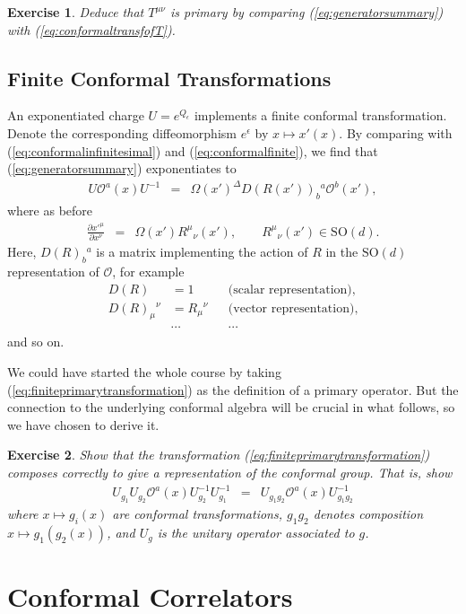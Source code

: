 \documentclass[11pt]{ws-rv9x6}
\newcommand\be{\begin{eqnarray}}
\newcommand\ee{\end{eqnarray}}
\newcommand\cO{\mathcal{O}}
\newcommand\e\epsilon
\newcommand\<\langle
\renewcommand\>\rangle
\newcommand\nn{\nonumber}
\renewcommand\.{\cdot}
\newcommand\pdr[2]{\frac{\partial #1}{\partial #2}}
\newcommand\SO{\mathrm{SO}}
\newcommand\De{\Delta}
\newtheorem{exercise}{Exercise}[section]
\begin{document}
\begin{exercise}
Deduce that $T^{\mu\nu}$ is primary by comparing (\ref{eq:generatorsummary}) with (\ref{eq:conformaltransfofT}). 
\end{exercise}

\subsection{Finite Conformal Transformations}

An exponentiated charge $U=e^{Q_\e}$ implements a finite conformal transformation.  Denote the corresponding diffeomorphism $e^{\e}$ by $x\mapsto x'(x)$. By comparing with (\ref{eq:conformalinfinitesimal}) and (\ref{eq:conformalfinite}), we find that (\ref{eq:generatorsummary}) exponentiates to
\be
\label{eq:finiteprimarytransformation}
U \cO^a(x) U^{-1} &=& \Omega(x')^\De D(R(x'))_b{}^a\cO^b(x'),
\ee
where as before
\be
\pdr{x'^\mu}{x^\nu} &=& \Omega(x')R^\mu{}_\nu(x'),\qquad R^\mu{}_\nu(x')\in\SO(d).
\ee
Here, $D(R)_b{}^a$ is a matrix implementing the action of $R$ in the $\SO(d)$ representation of $\cO$, for example
\begin{align}
D(R) &= 1 && \textrm{(scalar representation)},\nn\\
D(R)_\mu{}^\nu &= R_\mu{}^\nu && \textrm{(vector representation)},\label{eq:vectorrep}\nn\\
 &\cdots&& \cdots
\end{align}
and so on.

We could have started the whole course by taking (\ref{eq:finiteprimarytransformation}) as the definition of a primary operator. But the connection to the underlying conformal algebra will be crucial in what follows, so we have chosen to derive it.

\begin{exercise}
Show that the transformation (\ref{eq:finiteprimarytransformation}) composes correctly to give a representation of the conformal group.  That is, show
\be
U_{g_1}U_{g_2}\cO^a(x) U_{g_2}^{-1} U_{g_1}^{-1} &=& U_{g_1g_2}\cO^a(x)U_{g_1g_2}^{-1}
\ee
where $x\mapsto g_{i}(x)$ are conformal transformations, $g_1g_2$ denotes composition $x\mapsto g_1(g_2(x))$, and $U_{g}$ is the unitary operator associated to $g$.
\end{exercise}

\section{Conformal Correlators}
\end{document}
